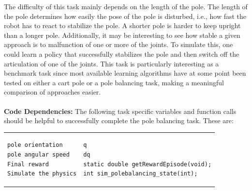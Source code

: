 \documentclass[11pt, article, colorback]{article}
\begin{document}
The difficulty of this task mainly depends on the length of the pole. The length of the pole determines how easily the 
pose of the pole is disturbed, i.e., how fast the robot has to react to stabilize the pole. A shorter pole is harder to keep 
upright than a longer pole. Additionally, it may be interesting to see how stable a given approach is to malfunction of 
one or more of the joints. To simulate this, one could learn a policy that successfully stabilizes the pole and then switch 
off the articulation of one of the joints.
This task is particularly interesting as a benchmark task since most available learning algorithms have at some point 
been tested on either a cart pole or a pole balancing task, making a meaningful comparison of approaches easier.		\\  \\
%
\textbf{Code Dependencies:} The following task specific variables and function calls should be helpful to 
successfully complete the pole balancing task. These are: \\
\begin{tabular}{ m{7cm} m{4cm}}
\begin{lstlisting}
pole orientation
pole angular speed
Final reward
Simulate the physics
\end{lstlisting}
& \begin{lstlisting}
q
dq
static double getRewardEpisode(void);
int sim_polebalancing_state(int);
\end{lstlisting}
\end{tabular} \\

		
\end{document}
